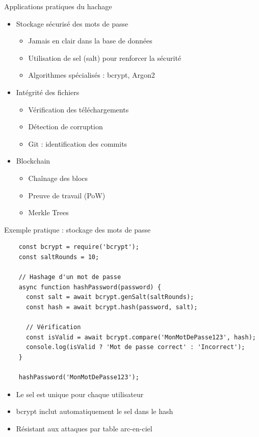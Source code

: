\begin{frame}{Applications pratiques du hachage}
  \begin{itemize}
    \item Stockage sécurisé des mots de passe
      \begin{itemize}
        \item Jamais en clair dans la base de données
        \item Utilisation de sel (salt) pour renforcer la sécurité
        \item Algorithmes spécialisés : bcrypt, Argon2
      \end{itemize}
    \item Intégrité des fichiers
      \begin{itemize}
        \item Vérification des téléchargements
        \item Détection de corruption
        \item Git : identification des commits
      \end{itemize}
    \item Blockchain
      \begin{itemize}
        \item Chaînage des blocs
        \item Preuve de travail (PoW)
        \item Merkle Trees
      \end{itemize}
  \end{itemize}
\end{frame}

\begin{frame}[fragile]{Exemple pratique : stockage des mots de passe}
  \begin{verbatim}
    const bcrypt = require('bcrypt');
    const saltRounds = 10;

    // Hashage d'un mot de passe
    async function hashPassword(password) {
      const salt = await bcrypt.genSalt(saltRounds);
      const hash = await bcrypt.hash(password, salt);
      
      // Vérification
      const isValid = await bcrypt.compare('MonMotDePasse123', hash);
      console.log(isValid ? 'Mot de passe correct' : 'Incorrect');
    }

    hashPassword('MonMotDePasse123');
  \end{verbatim}

  \begin{itemize}
    \item Le sel est unique pour chaque utilisateur
    \item bcrypt inclut automatiquement le sel dans le hash
    \item Résistant aux attaques par table arc-en-ciel
  \end{itemize}
\end{frame}

